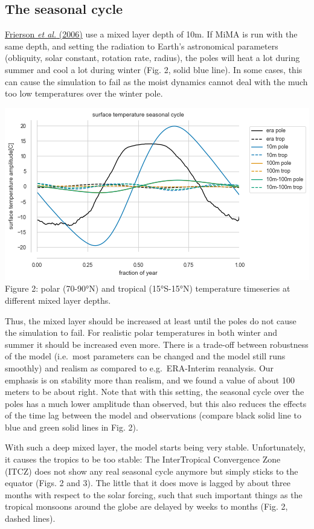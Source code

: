\subsection{The seasonal cycle}\label{the-seasonal-cycle}

\href{http://journals.ametsoc.org/doi/abs/10.1175/JAS3753.1}{Frierson
\emph{et al.} (2006)} use a mixed layer depth of 10m. If MiMA is run
with the same depth, and setting the radiation to Earth's astronomical
parameters (obliquity, solar constant, rotation rate, radius), the poles
will heat a lot during summer and cool a lot during winter (Fig. 2,
solid blue line). In some cases, this can cause the simulation to fail
as the moist dynamics cannot deal with the much too low temperatures
over the winter pole.

\includegraphics{ts_amp.png}\\
Figure 2: polar (70-90°N) and tropical (15°S-15°N) temperature
timeseries at different mixed layer depths.

Thus, the mixed layer should be increased at least until the poles do
not cause the simulation to fail. For realistic polar temperatures in
both winter and summer it should be increased even more. There is a
trade-off between robustness of the model (i.e.~most parameters can be
changed and the model still runs smoothly) and realism as compared to
e.g.~ERA-Interim reanalysis. Our emphasis is on stability more than
realism, and we found a value of about 100 meters to be about right.
Note that with this setting, the seasonal cycle over the poles has a
much lower amplitude than observed, but this also reduces the effects of
the time lag between the model and observations (compare black solid
line to blue and green solid lines in Fig. 2).

With such a deep mixed layer, the model starts being very stable.
Unfortunately, it causes the tropics to be too stable: The InterTropical
Convergence Zone (ITCZ) does not show any real seasonal cycle anymore
but simply sticks to the equator (Figs. 2 and 3). The little that it
does move is lagged by about three months with respect to the solar
forcing, such that such important things as the tropical monsoons around
the globe are delayed by weeks to months (Fig. 2, dashed lines).

